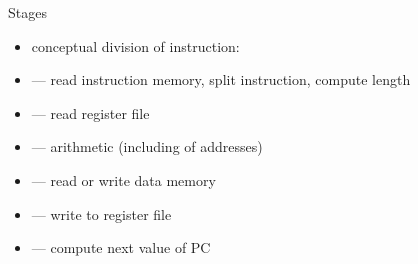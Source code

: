 
\begin{frame}{Stages}
    \begin{itemize}
        \item conceptual division of instruction:
        \vspace{.5cm}
        \item {} --- read instruction memory, split instruction, compute length
        \item {} --- read register file
        \item {} --- arithmetic (including of addresses)
        \item {} --- read or write data memory
        \item {} --- write to register file
        \item {} --- compute next value of PC
    \end{itemize}
\end{frame}
